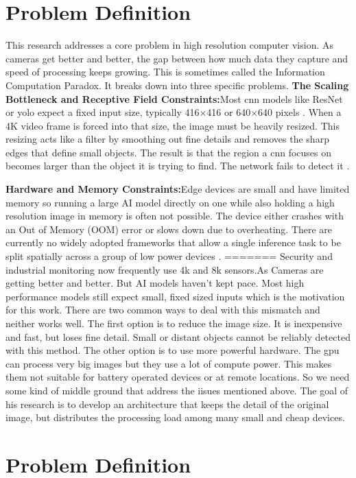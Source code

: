 \section{Problem Definition}
This research addresses a core problem in high resolution computer vision. As cameras get better and better, the gap between how much data they capture and speed of processing keeps growing. This is sometimes called the Information Computation Paradox. It breaks down into three specific problems.
\textbf{The Scaling Bottleneck and Receptive Field Constraints:}Most \gls{cnn} models like ResNet or \gls{yolo} expect a fixed input size, typically 416×416 or 640×640 pixels \cite{luo2016understanding} . When a 4K video frame is forced into that size, the image must be heavily resized. This resizing acts like a filter by smoothing out fine details and removes the sharp edges that define small objects. The result is that the region a \gls{cnn} focuses on becomes larger than the object it is trying to find. The network fails to detect it \cite{luo2016understanding}.


\textbf{Hardware and Memory Constraints:}Edge devices are small and have limited memory so running a large AI model directly on one while also holding a high  resolution image in memory is often not possible. The device either crashes with an Out of Memory (OOM) error or slows down due to overheating. There are currently no widely adopted frameworks that allow a single inference task to be split spatially across a group of low power devices \cite{hadidi2019distributed}.
=======
Security and industrial monitoring now frequently use 4k and 8k sensors.As Cameras are getting better and better. But AI models haven’t kept pace. Most high performance models still expect small, fixed sized inputs which is the motivation for this work.
There are two common ways to deal with this mismatch and neither works well.
The first option is to reduce the image size.  It is inexpensive and fast, but loses fine detail. Small or distant objects cannot be reliably detected with this method.
The other option is to use more powerful hardware. The \gls{gpu} can process very big images but they use a lot of compute power. This makes them not suitable for battery operated devices or at remote locations.
So we need some kind of middle ground that address the iisues mentioned above. The goal of his research is to develop an architecture that keeps the detail of the original image, but distributes the processing load among many small and cheap devices.


\section{Problem Definition}

